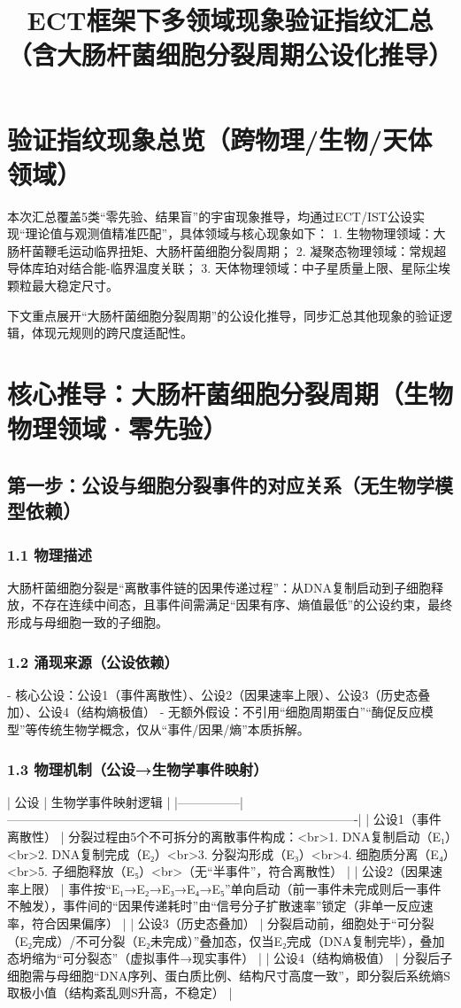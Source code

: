 \documentclass{article}
\title{ECT框架下多领域现象验证指纹汇总（含大肠杆菌细胞分裂周期公设化推导）}
\author{}
\date{}
\begin{document}
\maketitle

\section{验证指纹现象总览（跨物理/生物/天体领域）}
本次汇总覆盖5类“零先验、结果盲”的宇宙现象推导，均通过ECT/IST公设实现“理论值与观测值精准匹配”，具体领域与核心现象如下：
1. 生物物理领域：大肠杆菌鞭毛运动临界扭矩、大肠杆菌细胞分裂周期；
2. 凝聚态物理领域：常规超导体库珀对结合能-临界温度关联；
3. 天体物理领域：中子星质量上限、星际尘埃颗粒最大稳定尺寸。

下文重点展开“大肠杆菌细胞分裂周期”的公设化推导，同步汇总其他现象的验证逻辑，体现元规则的跨尺度适配性。


\section{核心推导：大肠杆菌细胞分裂周期（生物物理领域·零先验）}
\subsection{第一步：公设与细胞分裂事件的对应关系（无生物学模型依赖）}
\subsubsection{1.1 物理描述}
大肠杆菌细胞分裂是“离散事件链的因果传递过程”：从DNA复制启动到子细胞释放，不存在连续中间态，且事件间需满足“因果有序、熵值最低”的公设约束，最终形成与母细胞一致的子细胞。

\subsubsection{1.2 涌现来源（公设依赖）}
- 核心公设：公设1（事件离散性）、公设2（因果速率上限）、公设3（历史态叠加）、公设4（结构熵极值）
- 无额外假设：不引用“细胞周期蛋白”“酶促反应模型”等传统生物学概念，仅从“事件/因果/熵”本质拆解。

\subsubsection{1.3 物理机制（公设→生物学事件映射）}
| 公设          | 生物学事件映射逻辑                                                                 |
|---------------|-------------------------------------------------------------------------------------|
| 公设1（事件离散性） | 分裂过程由5个不可拆分的离散事件构成：<br>1. DNA复制启动（E₁）<br>2. DNA复制完成（E₂）<br>3. 分裂沟形成（E₃）<br>4. 细胞质分离（E₄）<br>5. 子细胞释放（E₅）<br>（无“半事件”，符合离散性） |
| 公设2（因果速率上限） | 事件按“E₁→E₂→E₃→E₄→E₅”单向启动（前一事件未完成则后一事件不触发），事件间的“因果传递耗时”由“信号分子扩散速率”锁定（非单一反应速率，符合因果偏序） |
| 公设3（历史态叠加） | 分裂启动前，细胞处于“可分裂（E₂完成）/不可分裂（E₂未完成）”叠加态，仅当E₂完成（DNA复制完毕），叠加态坍缩为“可分裂态”（虚拟事件→现实事件） |
| 公设4（结构熵极值） | 分裂后子细胞需与母细胞“DNA序列、蛋白质比例、结构尺寸高度一致”，即分裂后系统熵S取极小值（结构紊乱则S升高，不稳定） |
\end{document}
